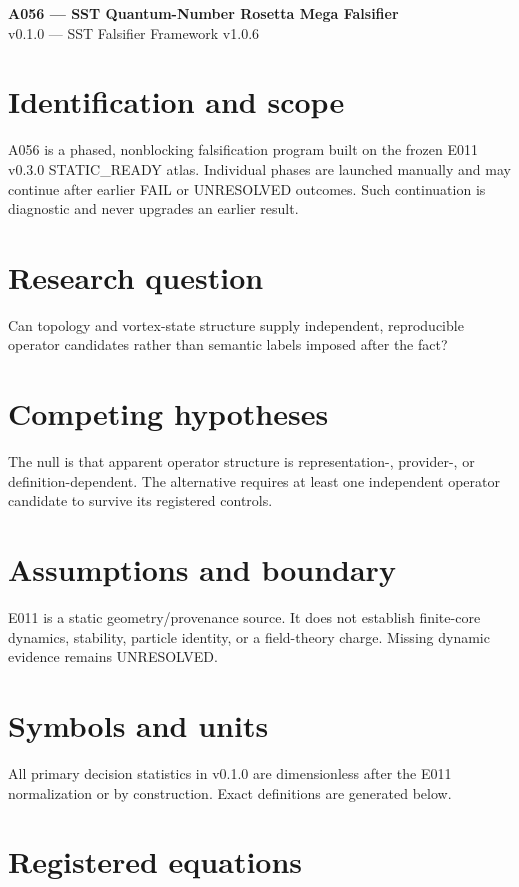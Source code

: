 \documentclass[11pt]{article}
\begin{document}
\begin{center}{\Large\bfseries A056 --- SST Quantum-Number Rosetta Mega Falsifier}\\[3pt]
{\large v0.1.0 --- SST Falsifier Framework v1.0.6}\end{center}
\section{Identification and scope}
A056 is a phased, nonblocking falsification program built on the frozen E011 v0.3.0 STATIC\_READY atlas. Individual phases are launched manually and may continue after earlier FAIL or UNRESOLVED outcomes. Such continuation is diagnostic and never upgrades an earlier result.
\section{Research question}
Can topology and vortex-state structure supply independent, reproducible operator candidates rather than semantic labels imposed after the fact?
\section{Competing hypotheses}
The null is that apparent operator structure is representation-, provider-, or definition-dependent. The alternative requires at least one independent operator candidate to survive its registered controls.
\section{Assumptions and boundary}
E011 is a static geometry/provenance source. It does not establish finite-core dynamics, stability, particle identity, or a field-theory charge. Missing dynamic evidence remains UNRESOLVED.
\section{Symbols and units}
All primary decision statistics in v0.1.0 are dimensionless after the E011 normalization or by construction. Exact definitions are generated below.
\section{Registered equations}
\end{document}
